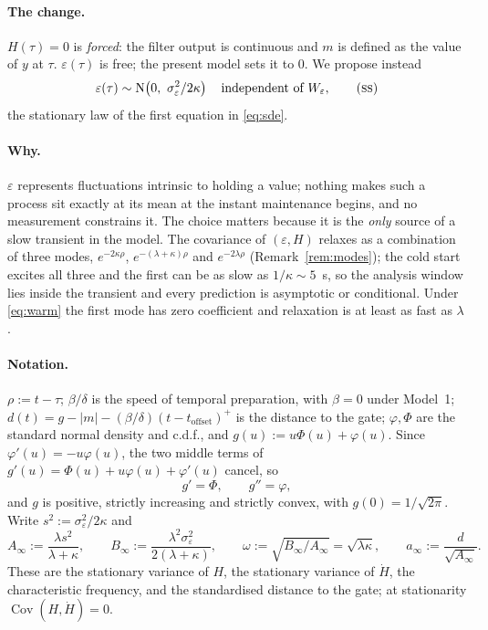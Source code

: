 \documentclass[11pt,a4paper]{article}
\theoremstyle{remark}\newtheorem{remark}[proposition]{Remark}
\newcommand{\Cov}{\operatorname{Cov}}
\newcommand{\Ain}{A_{\infty}}
\newcommand{\Bin}{B_{\infty}}
\begin{document}
\paragraph{The change.}
$H(\tau)=0$ is \emph{forced}: the filter output is continuous and $m$ is defined as
the value of $y$ at $\tau$. $\varepsilon(\tau)$ is free; the present model sets it to
$0$. We propose instead
\begin{equation}
\varepsilon(\tau)\sim\mathrm{N}\!\left(0,\ \sigma_\varepsilon^2/2\kappa\right)
\quad\text{independent of }W_\varepsilon,
\tag{\textsc{ss}}\label{eq:warm}
\end{equation}
the stationary law of the first equation in \eqref{eq:sde}.

\paragraph{Why.}
$\varepsilon$ represents fluctuations intrinsic to holding a value; nothing makes such
a process sit exactly at its mean at the instant maintenance begins, and no
measurement constrains it. The choice matters because it is the \emph{only} source of
a slow transient in the model. The covariance of $(\varepsilon,H)$ relaxes as a
combination of three modes, $e^{-2\kappa\rho}$, $e^{-(\lambda+\kappa)\rho}$ and
$e^{-2\lambda\rho}$ (Remark~\ref{rem:modes}); the cold start excites all three and the
first can be as slow as $1/\kappa\sim5$~s, so the analysis window lies inside the
transient and every prediction is asymptotic or conditional. Under \eqref{eq:warm} the
first mode has zero coefficient and relaxation is at least as fast as $\lambda$.

\paragraph{Notation.}
$\rho:=t-\tau$; $\beta/\delta$ is the speed of temporal preparation, with $\beta=0$
under Model~1; $d(t)=g-|m|-(\beta/\delta)(t-t_{\mathrm{offset}})^{+}$ is the distance
to the gate; $\varphi,\Phi$ are the standard normal density and c.d.f., and
$g(u):=u\Phi(u)+\varphi(u)$. Since $\varphi'(u)=-u\varphi(u)$, the two middle terms of
$g'(u)=\Phi(u)+u\varphi(u)+\varphi'(u)$ cancel, so
\begin{equation}
g'=\Phi,\qquad g''=\varphi ,
\label{eq:gprime}
\end{equation}
and $g$ is positive, strictly increasing and strictly convex, with
$g(0)=1/\sqrt{2\pi}$. Write
$s^{2}:=\sigma_\varepsilon^{2}/2\kappa$ and
\begin{equation}
\Ain:=\frac{\lambda s^{2}}{\lambda+\kappa},\qquad
\Bin:=\frac{\lambda^{2}\sigma_\varepsilon^{2}}{2(\lambda+\kappa)},\qquad
\omega:=\sqrt{\Bin/\Ain}=\sqrt{\lambda\kappa},\qquad
a_\infty:=\frac{d}{\sqrt{\Ain}} .
\label{eq:stat}
\end{equation}
These are the stationary variance of $H$, the stationary variance of $\dot H$, the
characteristic frequency, and the standardised distance to the gate; at stationarity
$\Cov(H,\dot H)=0$.
\end{document}
